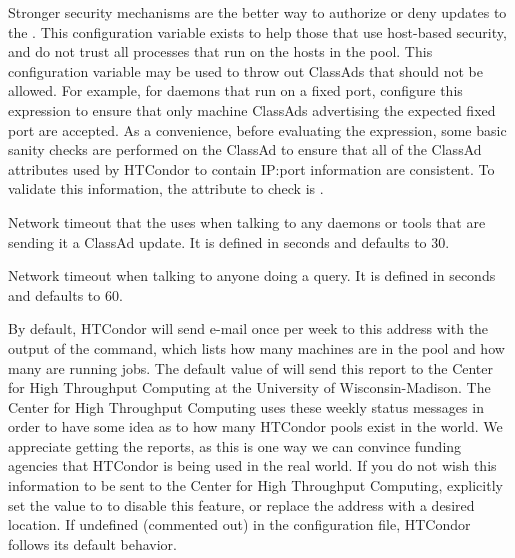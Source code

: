 \begin{description}
  Stronger security mechanisms are the better way to
  authorize or deny updates to the .
  This configuration variable exists to help those that
  use host-based security, and
  do not trust all processes that run on the hosts in the pool.
  This configuration variable may be used to throw out ClassAds that
  should not be allowed.  For example, for
   daemons that run on a fixed port,
  configure this expression to ensure that 
  only machine ClassAds advertising the expected
  fixed port are accepted.  As a convenience, before evaluating the
  expression, some basic sanity checks are performed on the ClassAd to
  ensure that all of the ClassAd attributes used by HTCondor to contain
  IP:port information are consistent.  To validate this
  information, the attribute to check is .
 

\label{param:ClientTimeout}
\item[\Macro{CLIENT\_TIMEOUT}]
  Network timeout that the  uses when talking to any daemons
  or tools that are sending it a ClassAd update.
  It is defined in seconds and defaults to 30.
  
\label{param:QueryTimeout}
\item[\Macro{QUERY\_TIMEOUT}]
  Network timeout when talking to anyone doing a query.
  It is defined in seconds and defaults to 60.
  
\label{param:CondorDevelopers}
\item[\Macro{CONDOR\_DEVELOPERS}]
  By default,
  HTCondor will send e-mail once per week to this address with the output
  of the  command, which lists how many machines
  are in the pool and how many are running jobs.  The default
  value of  will send this report to
  the Center for High Throughput Computing at 
  the University of Wisconsin-Madison.
  The Center for High Throughput Computing uses
  these weekly status messages in order to have some idea as to how
  many HTCondor pools exist in the world.  We appreciate
  getting the reports, as this is one way we can convince funding
  agencies that HTCondor is being used in the real world.  
  If you do not wish this information to be sent to 
  the Center for High Throughput Computing,
  explicitly set the value to  to disable this feature,
  or replace the
  address with a desired location.  
  If undefined (commented out) in the configuration file, HTCondor follows
  its default behavior.


\end{description}
